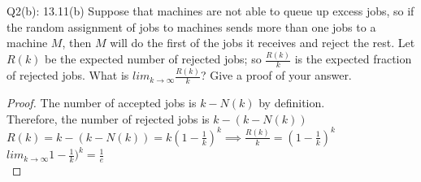 \begin{problem}
  {Q2(b): 13.11(b)}
  Suppose that machines are not able to queue up excess jobs, so if the random assignment of jobs to machines sends more than one jobs to a machine
  $M$, then $M$ will do the first of the jobs it receives and reject the rest. Let $R(k)$ be the expected number of rejected jobs; so $\frac{R(k)}{k}$
  is the expected fraction of rejected jobs. What is $lim_{k \rightarrow \infty}\frac{R(k)}{k}$? Give a proof of your answer.
  \begin{proof}
    The number of accepted jobs is $k - N(k)$ by definition. \\
    Therefore, the number of rejected jobs is $k - (k - N(k))$ \\
    $R(k) = k - (k - N(k)) = k(1 - \frac{1}{k})^k \implies \frac{R(k)}{k} = (1 - \frac{1}{k})^k$ \\
    $lim_{k \rightarrow \infty}1 - \frac{1}{k})^k = \frac{1}{e}$ \\
  \end{proof}
\end{problem}
